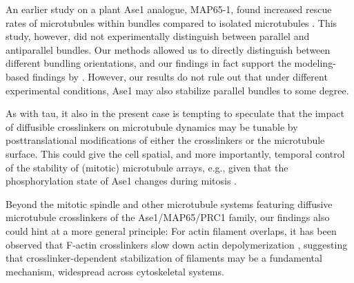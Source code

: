 An earlier study on a plant Ase1 analogue, MAP65-1, found increased rescue rates of microtubules within bundles compared to isolated microtubules \parencite{Stoppin-Mellet2013}. This study, however, did not experimentally distinguish between parallel and antiparallel bundles. Our methods allowed us to directly distinguish between different bundling orientations, and our findings in fact support the modeling-based findings by \parencite{Stoppin-Mellet2013}. However, our results do not rule out that under different experimental conditions, Ase1 may also stabilize parallel bundles to some degree.\par

As with tau, it also in the present case is tempting to speculate that the impact of diffusible crosslinkers on microtubule dynamics may be tunable by posttranslational modifications of either the crosslinkers or the microtubule surface. This could give the cell spatial, and more importantly, temporal control of the stability of (mitotic) microtubule arrays, e.g., given that the phosphorylation state of Ase1 changes during mitosis . \par

Beyond the mitotic spindle and other microtubule systems featuring diffusive microtubule crosslinkers of the Ase1/MAP65/PRC1 family, our findings also could hint at a more general principle: For actin filament overlaps, it has been observed that F-actin crosslinkers slow down actin depolymerization \parencite{maul2003eplin,schmoller2011slow}, suggesting that crosslinker-dependent stabilization of filaments may be a fundamental mechanism, widespread across cytoskeletal systems.